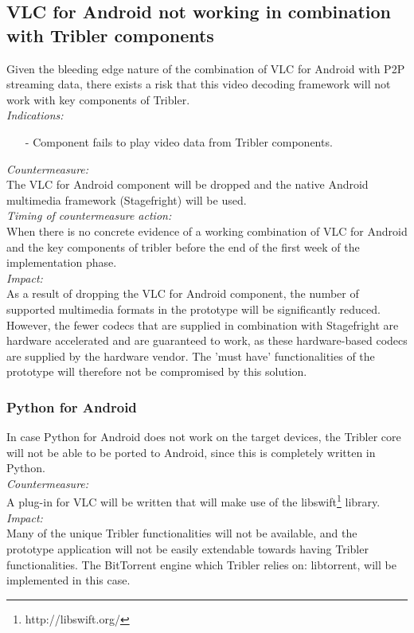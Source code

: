 \subsection{VLC for Android not working in combination with Tribler components}
Given the bleeding edge nature of the combination of VLC for Android with P2P streaming data, there exists a risk that this video decoding framework will not work with key components of Tribler.\\
\newline
\textit{Indications:}
\begin{itemize}
	\item[-]Component fails to play video data from Tribler components.
\end{itemize}
\textit{Countermeasure:}\\
The VLC for Android component will be dropped and the native Android multimedia framework (Stagefright) will be used.\\
\newline
\textit{Timing of countermeasure action:}\\
When there is no concrete evidence of a working combination of VLC for Android and the key components of tribler before the end of the first week of the implementation phase.\\
\newline
\textit{Impact:}\\
As a result of dropping the VLC for Android component, the number of supported multimedia formats in the prototype will be significantly reduced. However, the fewer codecs that are supplied in combination with Stagefright are hardware accelerated and are guaranteed to work, as these hardware-based codecs are supplied by the hardware vendor. The 'must have' functionalities of the prototype will therefore not be compromised by this solution.\\ 
\subsubsection{Python for Android}
In case Python for Android does not work on the target devices, the Tribler core will not be able to be ported to Android, since this is completely written in Python.\\
\newline
\textit{Countermeasure:}\\
A plug-in for VLC will be written that will make use of the libswift\footnote{http://libswift.org/} library.\\
\newline
\textit{Impact:}\\
Many of the unique Tribler functionalities will not be available, and the prototype application will not be easily extendable towards having Tribler functionalities. The BitTorrent engine which Tribler relies on: libtorrent, will be implemented in this case.

